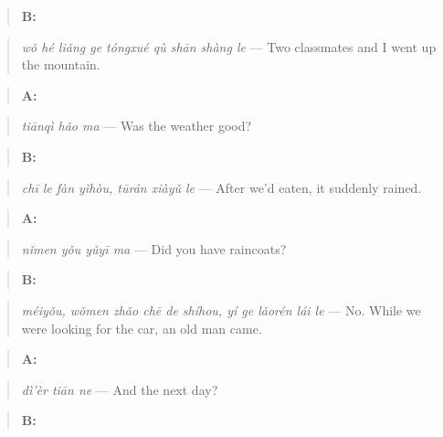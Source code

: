 \begin{quote}
\textbf{B:} 
\end{quote}

\begin{quote}
\emph{wǒ hé liǎng ge tóngxué qù shān shàng le} — Two classmates and I went up the mountain.
\end{quote}

\begin{quote}
\textbf{A:} 
\end{quote}

\begin{quote}
\emph{tiānqì hǎo ma} — Was the weather good?
\end{quote}

\begin{quote}
\textbf{B:}  
\end{quote}

\begin{quote}
\emph{chī le fàn yǐhòu, tūrán xiàyǔ le} — After we'd eaten, it suddenly rained.
\end{quote}

\begin{quote}
\textbf{A:} 
\end{quote}

\begin{quote}
\emph{nǐmen yǒu yǔyī ma} — Did you have raincoats?
\end{quote}

\begin{quote}
\textbf{B:}   
\end{quote}

\begin{quote}
\emph{méiyǒu, wǒmen zhǎo chē de shíhou, yí ge lǎorén lái le} — No. While we were looking for the car, an old man came.
\end{quote}

\begin{quote}
\textbf{A:} 
\end{quote}

\begin{quote}
\emph{dì'èr tiān ne} — And the next day?
\end{quote}

\begin{quote}
\textbf{B:}   
\end{quote}


